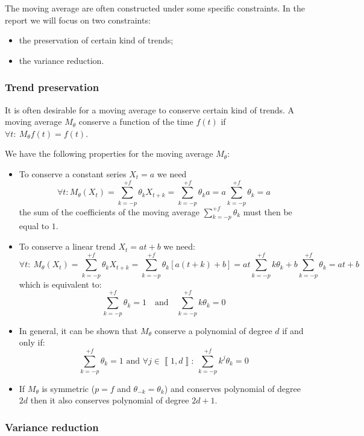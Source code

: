 \documentclass[
  12pt,
  ,
  a4paper]{article}
\newcommand\1{\mathds{1}}
\begin{document}
The moving average are often constructed under some specific constraints.
In the report we will focus on two constraints:

\begin{itemize}
\item
  the preservation of certain kind of trends;
\item
  the variance reduction.
\end{itemize}

\hypertarget{trend-preservation}{%
\subsubsection{Trend preservation}\label{trend-preservation}}

It is often desirable for a moving average to conserve certain kind of trends.
A moving average \(M_\theta\) conserve a function of the time \(f(t)\) if \(\forall t:\:M_\theta f(t)=f(t)\).

We have the following properties for the moving average \(M_\theta\):

\begin{itemize}
\item
  To conserve a constant series \(X_t=a\) we need
  \[
  \forall t:M_\theta(X_t)=\sum_{k=-p}^{+f}\theta_kX_{t+k}=\sum_{k=-p}^{+f}\theta_ka=a\sum_{k=-p}^{+f}\theta_k=a
  \]
  the sum of the coefficients of the moving average \(\sum_{k=-p}^{+f}\theta_k\) must then be equal to \(1\).
\item
  To conserve a linear trend \(X_t=at+b\) we need:
  \[
  \forall t:\:M_\theta(X_t)=\sum_{k=-p}^{+f}\theta_kX_{t+k}=\sum_{k=-p}^{+f}\theta_k[a(t+k)+b]=at\sum_{k=-p}^{+f}k\theta_k+b\sum_{k=-p}^{+f}\theta_k=at+b
  \]
  which is equivalent to:
  \[
  \sum_{k=-p}^{+f}\theta_k=1
  \quad\text{and}\quad
  \sum_{k=-p}^{+f}k\theta_k=0
  \]
\item
  In general, it can be shown that \(M_\theta\) conserve a polynomial of degree \(d\) if and only if:
  \[
  \sum_{k=-p}^{+f}\theta_k=1 
   \text{ and } 
  \forall j \in \left\llbracket 1,d\right\rrbracket:\:
  \sum_{k=-p}^{+f}k^j\theta_k=0
  \]
\item
  If \(M_\theta\) is symmetric (\(p=f\) and \(\theta_{-k} = \theta_k\)) and conserves polynomial of degree \(2d\) then it also conserves polynomial of degree \(2d+1\).
\end{itemize}

\hypertarget{variance-reduction}{%
\subsubsection{Variance reduction}\label{variance-reduction}}
\end{document}
